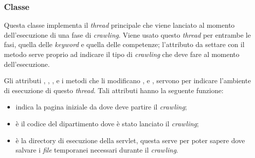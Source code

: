 \documentclass[tesi.tex]{subfiles}
\begin{document}
\subsubsection{Classe }
\begin{center}
\end{center}
Questa classe implementa il \emph{thread} principale che viene
lanciato al momento dell'esecuzione di una fase di
\emph{crawling}. Viene usato questo \emph{thread} per entrambe le
fasi, quella delle \emph{keyword} e quella delle competenze;
l'attributo  da settare con il metodo
 serve proprio ad indicare il tipo di
\emph{crawling} che deve fare al momento dell'esecuzione.

Gli attributi , ,
, e i metodi che li modificano , e
, servono per indicare l'ambiente di
esecuzione di questo \emph{thread}. Tali attributi hanno la seguente
funzione:
\begin{itemize}
\item {} indica la pagina
  iniziale da dove deve partire il \emph{crawling};
\item {} \`e il codice del dipartimento dove \`e stato
  lanciato il \emph{crawling};
\item {} \`e la directory
  di esecuzione della servlet, questa serve per poter sapere dove
  salvare i \emph{file} temporanei necessari durante il \emph{crawling}.
\end{itemize}
\end{document}
